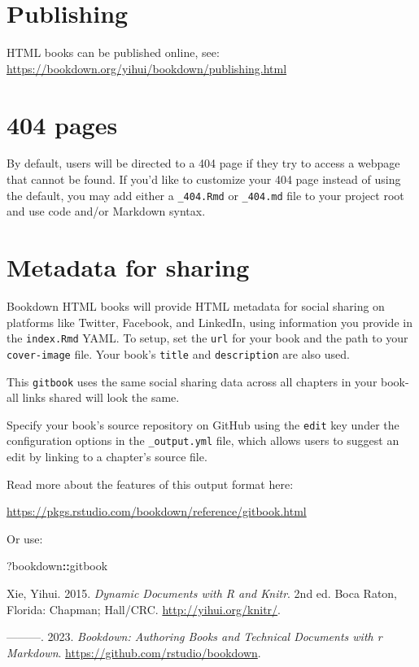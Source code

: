 \documentclass[
]{book}
\newenvironment{Shaded}{\begin{snugshade}}{\end{snugshade}}
\newcommand{\NormalTok}[1]{#1}
\newcommand{\SpecialCharTok}[1]{\textcolor[rgb]{0.81,0.36,0.00}{\textbf{#1}}}
\newlength{\cslhangindent}
\newlength{\cslentryspacingunit} %
\newenvironment{CSLReferences}[2] %
 {%
  \setlength{\parindent}{0pt}
  \ifodd #1
  \let\oldpar\par
  \def\par{\hangindent=\cslhangindent\oldpar}
  \fi
  \setlength{\parskip}{#2\cslentryspacingunit}
 }%
 {}
\begin{document}
\hypertarget{publishing}{%
\section{Publishing}\label{publishing}}

HTML books can be published online, see:
\url{https://bookdown.org/yihui/bookdown/publishing.html}

\hypertarget{pages}{%
\section{404 pages}\label{pages}}

By default, users will be directed to a 404 page if they try to access a
webpage that cannot be found. If you'd like to customize your 404 page
instead of using the default, you may add either a \texttt{\_404.Rmd} or
\texttt{\_404.md} file to your project root and use code and/or Markdown
syntax.

\hypertarget{metadata-for-sharing}{%
\section{Metadata for sharing}\label{metadata-for-sharing}}

Bookdown HTML books will provide HTML metadata for social sharing on
platforms like Twitter, Facebook, and LinkedIn, using information you
provide in the \texttt{index.Rmd} YAML. To setup, set the \texttt{url}
for your book and the path to your \texttt{cover-image} file. Your
book's \texttt{title} and \texttt{description} are also used.

This \texttt{gitbook} uses the same social sharing data across all
chapters in your book- all links shared will look the same.

Specify your book's source repository on GitHub using the \texttt{edit}
key under the configuration options in the \texttt{\_output.yml} file,
which allows users to suggest an edit by linking to a chapter's source
file.

Read more about the features of this output format here:

\url{https://pkgs.rstudio.com/bookdown/reference/gitbook.html}

Or use:

\begin{Shaded}
\begin{Highlighting}[]
\NormalTok{?bookdown}\SpecialCharTok{::}\NormalTok{gitbook}
\end{Highlighting}
\end{Shaded}

\hypertarget{refs}{}
\begin{CSLReferences}{1}{0}
\leavevmode{}%
Xie, Yihui. 2015. \emph{Dynamic Documents with {R} and Knitr}. 2nd ed.
Boca Raton, Florida: Chapman; Hall/CRC. \url{http://yihui.org/knitr/}.

\leavevmode{}%
---------. 2023. \emph{Bookdown: Authoring Books and Technical Documents
with r Markdown}. \url{https://github.com/rstudio/bookdown}.

\end{CSLReferences}

\backmatter
\end{document}
